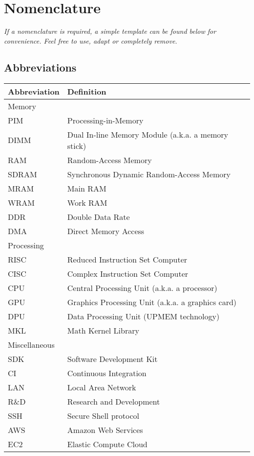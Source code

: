 \chapter*{Nomenclature}

\emph{If a nomenclature is required, a simple template can be found below for convenience. Feel free to use, adapt or completely remove.}

\section*{Abbreviations}

\begin{longtable}{p{2.5cm}p{8cm}}
    \toprule
    Abbreviation & Definition \\
    \midrule\midrule\endhead %
    Memory & \\
    \midrule
    PIM & Processing-in-Memory \\
    DIMM & Dual In-line Memory Module (a.k.a. a memory stick) \\
    RAM & Random-Access Memory \\
    SDRAM & Synchronous Dynamic Random-Access Memory \\
    MRAM & Main RAM \\
    WRAM & Work RAM \\
    DDR & Double Data Rate \\
    DMA & Direct Memory Access \\
    \midrule
    Processing & \\
    \midrule
    RISC & Reduced Instruction Set Computer \\
    CISC & Complex Instruction Set Computer \\
    CPU & Central Processing Unit (a.k.a. a processor) \\
    GPU & Graphics Processing Unit (a.k.a. a graphics card) \\
    DPU & Data Processing Unit (UPMEM technology) \\
    MKL & Math Kernel Library \\
    \midrule
    Miscellaneous & \\
    \midrule
    SDK & Software Development Kit \\
    CI & Continuous Integration \\
    LAN & Local Area Network \\
    R\&D & Research and Development \\
    SSH & Secure Shell protocol \\
    AWS & Amazon Web Services \\
    EC2 & Elastic Compute Cloud \\
    \bottomrule
\end{longtable}
